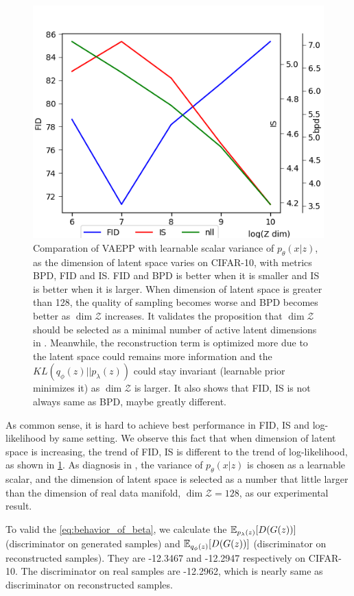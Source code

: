 \begin{figure}
	\centering
	\includegraphics[width=0.8\columnwidth]{../figures/fid_is_nll_on_different_dim.png}
	\caption{
	Comparation of VAEPP with learnable scalar variance of $p_\theta(x|z)$, as the dimension of latent space varies on CIFAR-10, with metrics BPD, FID and IS. FID and BPD is better when it is smaller and IS is better when it is larger. When dimension of latent space is greater than 128, the quality of sampling becomes worse and BPD becomes better as $\dim \mathcal{Z}$ increases. It validates the proposition that $\dim \mathcal{Z}$ should be selected as a minimal number of active latent dimensions in \protect\cite{dai2019diagnosing}. Meanwhile, the reconstruction term is optimized more due to the latent space could remains more information and the $KL(q_\phi(z)||p_\lambda(z))$ could stay invariant (learnable prior minimizes it) as $\dim \mathcal{Z}$ is larger. It also shows that FID, IS is not always same as BPD, maybe greatly different. 
	}
	\label{fig:compare_nD_over_z_dim}
\end{figure}

As common sense, it is hard to achieve best performance in FID, IS and log-likelihood by same setting. We observe this fact that when dimension of latent space is increasing, the trend of FID, IS is different to the trend of log-likelihood, as shown in \cref{fig:compare_nD_over_z_dim}. As diagnosis in \cite{dai2019diagnosing}, the variance of $p_\theta(x|z)$ is chosen as a learnable scalar, and the dimension of latent space is selected as a number that little larger than the dimension of real data manifold, $\dim \mathcal{Z} = 128$, as our experimental result.  

To valid the \cref{eq:behavior_of_beta}, we calculate the $\operatorname{\mathbb{E}}_{p_\lambda(z)}[ D(G(z))]$ (discriminator on generated samples) and $\operatorname{\mathbb{E}}_{q_\phi(z)}[ D(G(z))]$ (discriminator on reconstructed samples). They are -12.3467 and -12.2947 respectively on CIFAR-10. The discriminator on real samples are -12.2962, which is nearly same as discriminator on reconstructed samples. 

